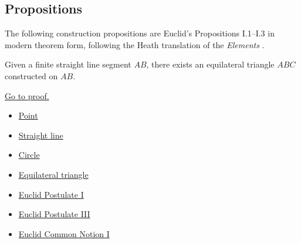 \subsection*{Propositions}

The following construction propositions are Euclid's Propositions I.1--I.3 in
modern theorem form, following the Heath translation of the
\textit{Elements} \citep[Book I, Propositions 1--3]{euclid-elements-heath}.

\begin{theorem}
\label{thm:euclid-i-1}
Given a finite straight line segment $AB$, there exists an equilateral
triangle $ABC$ constructed on $AB$.
\end{theorem}
\begin{remark*}[Proof]
\hyperref[prf:euclid-i-1]{Go to proof.}
\end{remark*}
\begin{lra-not-visible}
\begin{dependencies}
\begin{itemize}
  \item \hyperref[def-euclid-point]{Point}
  \item \hyperref[def-euclid-straight-line]{Straight line}
  \item \hyperref[def-euclid-circle]{Circle}
  \item \hyperref[def-euclid-triangle-side-classes]{Equilateral triangle}
  \item \hyperref[ax-euclid-postulate-draw-straight-line]{Euclid Postulate I}
  \item \hyperref[ax-euclid-postulate-describe-circle]{Euclid Postulate III}
  \item \hyperref[ax-euclid-common-notion-things-equal-to-same]{Euclid Common Notion I}
\end{itemize}
\end{dependencies}
\end{lra-not-visible}

